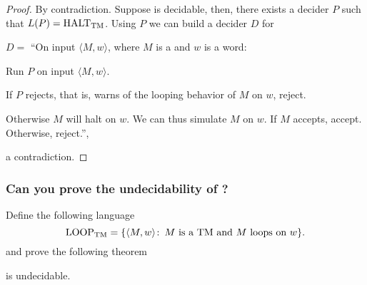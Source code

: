 \begin{proof}
By contradiction. Suppose \HALTtm{} is decidable, then,
there exists a decider \(P\) such that \(L(P) =
\text{HALT\textsubscript{TM}{}} \). Using \(P\) we
can build a decider \(D\) for \Atm{}

\begin{TMachine}{\(D =\) ``On input \(\langle M,w \rangle\), where \(M\) is a \TM{} and \(w\) is
a word:}
	\item Run \(P\) on input \(\langle M,w \rangle\).
	\item If \(P\) rejects, that is, warns of the looping behavior of \(M\) on
		\(w\), reject.
	\item Otherwise \(M\) will halt on \(w\). We can thus simulate \(M\) on
		\(w\). If \(M\) accepts, accept. Otherwise, reject.'',
\end{TMachine}
a contradiction.
\end{proof}

\subsubsection{Can you prove the undecidability of \LOOPtm{}?}

Define the following language
\begin{displaymath}
\text{LOOP\textsubscript{TM}{}} = \{ \langle M,w \rangle \colon\, \text{\(M\) is a TM{} and \(M\)
loops on \(w\)} \}.
\end{displaymath}
and prove the following theorem
\begin{theorem}\label{LOOPtm}
\LOOPtm{} is undecidable.
\end{theorem}
